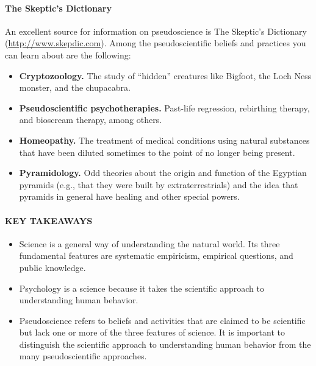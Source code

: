 \documentclass[
]{krantz}
\providecommand{\tightlist}{%
  \setlength{\itemsep}{0pt}\setlength{\parskip}{0pt}}
\begin{document}
\hypertarget{the-skeptics-dictionary}{%
\paragraph*{The Skeptic's Dictionary}\label{the-skeptics-dictionary}}

An excellent source for information on pseudoscience is The Skeptic's Dictionary (\url{http://www.skepdic.com}). Among the pseudoscientific beliefs and practices you can learn about are the following:

\begin{itemize}
\tightlist
\item
  \textbf{Cryptozoology.} The study of ``hidden'' creatures like Bigfoot, the Loch Ness monster, and the chupacabra.
\item
  \textbf{Pseudoscientific psychotherapies.} Past-life regression, rebirthing therapy, and bioscream therapy, among others.
\item
  \textbf{Homeopathy.} The treatment of medical conditions using natural substances that have been diluted sometimes to the point of no longer being present.
\item
  \textbf{Pyramidology.} Odd theories about the origin and function of the Egyptian pyramids (e.g., that they were built by extraterrestrials) and the idea that pyramids in general have healing and other special powers.
\end{itemize}

\hypertarget{key-takeaways}{%
\paragraph*{KEY TAKEAWAYS}\label{key-takeaways}}

\begin{itemize}
\item
  Science is a general way of understanding the natural world. Its three fundamental features are systematic empiricism, empirical questions, and public knowledge.
\item
  Psychology is a science because it takes the scientific approach to understanding human behavior.
\item
  Pseudoscience refers to beliefs and activities that are claimed to be scientific but lack one or more of the three features of science. It is important to distinguish the scientific approach to understanding human behavior from the many pseudoscientific approaches.
\end{itemize}
\end{document}
